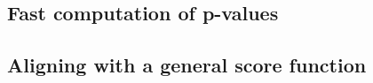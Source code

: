 



\subsection{Fast computation of p-values}





\subsection{Aligning with a general score function}





